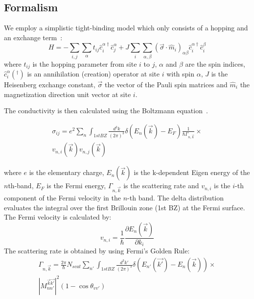 \documentclass[prb,showpacs,amsmath,amssymb,superscriptaddress,twocolumn,floatfix]{revtex4-1}
\begin{document}
\subsection{Formalism}

We employ a simplistic tight-binding model which only consists of a hopping and an exchange term~\cite{Gonzalez-Hernandez:2024}:
\begin{equation}
	H = -\sum_{i, j}\sum_\alpha t_{ij} {\hat{c}_i^{\alpha\dagger}} \hat{c}^\alpha_j + J \sum_{i} \sum_{\alpha, \beta} (\vec{\sigma} \cdot \hat{m}_i)_{\alpha \beta} {\hat{c}_i^{\alpha\dagger}} \hat{c}^\beta_i 
	\label{eq_sdmodel}
\end{equation} 
where $t_{ij}$ is the hopping parameter from site $i$ to $j$, $\alpha$ and $\beta$ are the spin indices, ${\hat{c}_i^{\alpha}}(^\dagger)$ is an annihilation (creation) operator at site $i$ with spin $\alpha$, $J$ is the Heisenberg exchange constant, $\vec{\sigma}$ the vector of the Pauli spin matrices and $\hat{m}_i$ the magnetization direction unit vector at site $i$.

The conductivity is then calculated using the Boltzmann equation~\cite{Vyborny:2009}. 

\begin{multline}
	\sigma_{ij} = e^2 \sum_n  \int_ {1st BZ} \frac{d^3k}{(2\pi)^3} \delta(E_n(\vec{k}) - E_F) \frac{1}{\hbar \Gamma_{n, \vec{k}}} \times \\ v_{n,i}(\vec{k}) v_{n,j}(\vec{k})
	\label{eq_Boltzmann_1}
\end{multline}

where $e$ is the elementary charge, $E_n(\vec{k})$ is the k-dependent Eigen energy of the $n$th-band, $E_F$ is the Fermi energy, $\Gamma_{n, \vec{k}}$ is the scattering rate and $v_{n,i}$ is the $i$-th component of the Fermi velocity in the $n$-th band. The delta distribution evaluates the integral over the first Brillouin zone (1st BZ) at the Fermi surface. The Fermi velocity is calculated by:
%
\begin{equation}
	v_{n, i} = \frac{1}{\hbar} \frac{\partial E_n(\vec{k})}{\partial k_i}
\end{equation}
%
The scattering rate is obtained by using Fermi's Golden Rule:
%
\begin{multline}
	\Gamma_{n, \vec{k}} = \frac{2 \pi}{\hbar} N_{scat} \sum_{n'}  \int_ {1st BZ} \frac{d^3k'}{(2\pi)^3} \delta(E_{n'}(\vec{k'}) - E_n(\vec{k})) \times \\ |M^{\vec{k}\vec{k'}}_{nn'} |^2 (1 - \cos \theta_{vv'})
	\label{eq_FermiGoldenRule_1}
\end{multline}
\end{document}
